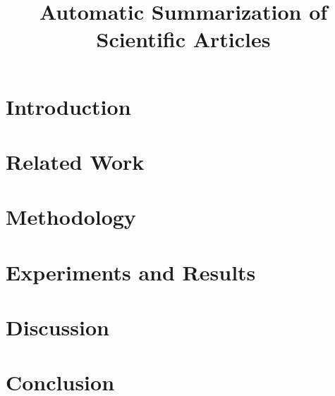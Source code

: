 \documentclass[11pt]{report}
\title{Automatic Summarization of Scientific Articles}
\date{}
\begin{document}
\maketitle
\begin{abstract}

\end{abstract}

\section{Introduction}
\label{section:introduction}


\section{Related Work}
\label{section:related work}


\section{Methodology}
\label{section: method}


\section{Experiments and Results}
\label{section:experiments}


\section{Discussion}
\label{section:discussion}


\section{Conclusion}
\label{section:conclusion}






\end{document}

